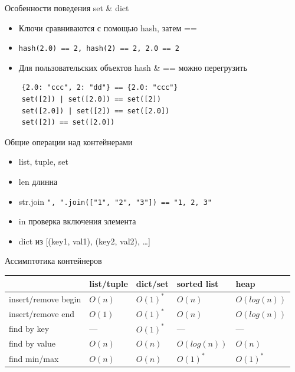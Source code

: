 \documentclass{article}
\begin{document}
\begin{center} Особенности поведения set \& dict \end{center}
\begin{itemize}
	\item Ключи сравниваются с помощью hash, затем ==
	\item \lstinline!hash(2.0) == 2, hash(2) == 2, 2.0 == 2!
	\item Для пользовательских объектов hash \& == можно перегрузить
\end{itemize}
\begin{lstlisting}
	{2.0: "ccc", 2: "dd"} == {2.0: "ccc"}
	set([2]) | set([2.0]) == set([2])
	set([2.0]) | set([2]) == set([2.0])
	set([2]) == set([2.0])
\end{lstlisting}
\newpage

\begin{center} Общие операции над контейнерами \end{center}
\begin{itemize}
	\item list, tuple, set
	\item len длинна 
	\item str.join \lstinline!", ".join(["1", "2", "3"]) == "1, 2, 3"! 
	\item in проверка включения элемента
	\item dict из [(key1, val1), (key2, val2), …]
\end{itemize}
\newpage

\begin{center} Ассимптотика контейнеров \end{center}
\begin{center}
\begin{tabular}{ | l | l | l | l | l | }
	\hline
       & \cellcolor[gray]{0.8} list/tuple & \cellcolor[gray]{0.8} dict/set &  \cellcolor[gray]{0.8} sorted list & \cellcolor[gray]{0.8} heap \\
  	\hline
  insert/remove begin     & \cellcolor{pink} $O(n)$ & \cellcolor{green} $O(1)^*$ & \cellcolor{pink} $O(n)$ & \cellcolor{Aquamarine} $O(log(n))$ \\
  	\hline
  insert/remove end       & \cellcolor{green} $O(1)$ & \cellcolor{green} $O(1)^*$ & \cellcolor{pink} $O(n)$ & \cellcolor{Aquamarine} $O(log(n))$  \\
  	\hline
  find by key      &  --- & \cellcolor{green} $O(1)^*$ & --- & --- \\
  	\hline
  find by value     &  \cellcolor{pink} $O(n)$ & \cellcolor{pink} $O(n)$ & \cellcolor{Aquamarine} $O(log(n))$ & \cellcolor{pink} $O(n)$ \\
  	\hline
  find min/max     &  \cellcolor{pink} $O(n)$ & \cellcolor{pink} $O(n)$ & \cellcolor{green} $O(1)^*$ & \cellcolor{green} $O(1)^*$ \\
  	\hline

\end{tabular}
\end{center}
\newpage
\end{document}
